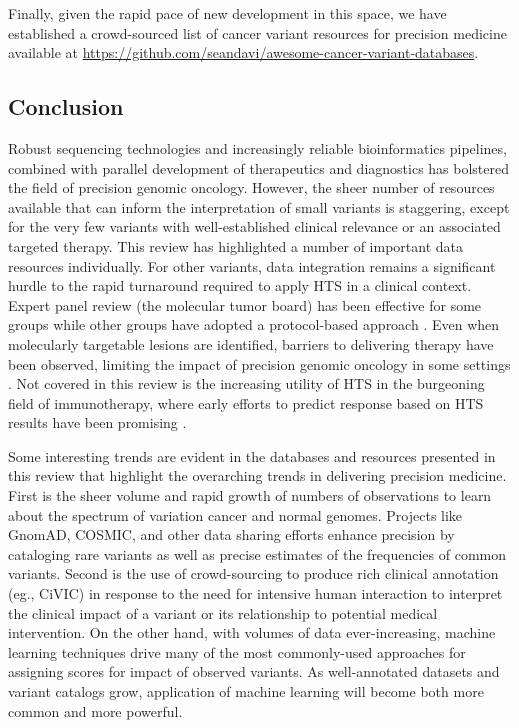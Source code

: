 \documentclass{article}
\begin{document}
Finally, given the rapid pace of new development in this space, we
have established a crowd-sourced list of cancer variant resources for
precision medicine available at
\url{https://github.com/seandavi/awesome-cancer-variant-databases}. 

\subsection{Conclusion}

Robust sequencing technologies and increasingly reliable
bioinformatics pipelines, combined with parallel development of
therapeutics and diagnostics has bolstered the field of precision
genomic oncology. However, the sheer number of resources available
that can inform the interpretation of small variants is staggering,
except for the very few variants with well-established clinical
relevance or an associated targeted therapy. This review has
highlighted a number of important data resources individually. For
other variants, data integration remains a significant hurdle to the
rapid turnaround required to apply HTS in a clinical context. Expert
panel review (the molecular tumor board) has been effective for some
groups \parencite{Knepper2017-no,Beltran2015-pz,Sohal2015-bi} while other
groups have adopted a protocol-based approach
\parencite{Ghazani2017-oo}. Even when molecularly targetable lesions are
identified, barriers to delivering therapy have been observed,
limiting the impact of precision genomic oncology in some settings
\parencite{Bryce2017-ht}. Not covered in this
review is the increasing utility of HTS in the burgeoning field of
immunotherapy, where early efforts to predict response based on HTS
results have been promising
\parencite{Wang2017-yd,Yarchoan2017-vl,Bethune2017-ns}. 


Some interesting trends are evident in the databases and resources
presented in this review that highlight the overarching trends in delivering
precision medicine. First is the sheer volume and rapid growth of
numbers of
observations to learn about the spectrum of variation
cancer and normal genomes. Projects like GnomAD, COSMIC, and other
data sharing efforts enhance precision by cataloging rare variants as
well as precise estimates of the frequencies of common
variants. Second is the use of
crowd-sourcing to produce rich clinical annotation (eg., CiVIC) in
response to the need for intensive human interaction to interpret the clinical impact of a variant or its relationship to
potential medical intervention. On the other hand, with volumes of data ever-increasing, machine learning
techniques drive many of the most commonly-used approaches for
assigning scores for impact of observed variants. As well-annotated
datasets and variant catalogs grow, application of machine learning
will become both more common and more powerful.
\end{document}
